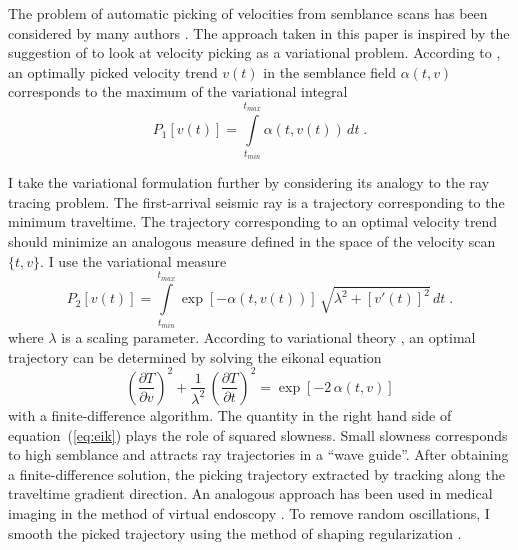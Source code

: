 

The problem of automatic picking of velocities from semblance scans
has been considered by many authors
\cite[]{SEG-1999-11621165,SEG-2003-20882091,SEG-2004-16271629}. The
approach taken in this paper is inspired by the suggestion of
\cite{harlan} to look at velocity picking as a variational
problem. According to \cite{harlan}, an optimally picked velocity trend
$v(t)$ in the semblance field $\alpha(t,v)$ corresponds to the maximum
of the variational integral
\begin{equation}
P_1[v(t)] = \int\limits_{t_{min}}^{t_{max}} \alpha\left(t,v(t)\right)\,d t\;.
\end{equation}

I take the variational formulation further by considering its
analogy to the ray tracing problem. The first-arrival seismic
ray is a trajectory corresponding to the minimum traveltime. The
trajectory corresponding to an optimal velocity trend should minimize
an analogous measure defined in the space of the velocity
scan~$\{t,v\}$. I use the variational measure
\begin{equation}
P_2[v(t)] = \int\limits_{t_{min}}^{t_{max}}
\exp[-\alpha\left(t,v(t)\right)]\,\sqrt{\lambda^2+\left[v'(t)\right]^2}\,d t\;.
\end{equation}
where $\lambda$ is a scaling parameter. According to  variational theory
\cite[]{lanc}, an optimal trajectory can be determined by solving the eikonal equation
\begin{equation}
\label{eq:eik}
\left(\frac{\partial T}{\partial v}\right)^2 + 
\frac{1}{\lambda^2}\,\left(\frac{\partial T}{\partial t}\right)^2 = 
\exp[-2\,\alpha\left(t,v\right)]
\end{equation}
with a finite-difference algorithm. The quantity in the right hand
side of equation~(\ref{eq:eik}) plays the role of squared slowness.
Small slowness corresponds to high semblance and attracts ray
trajectories in a ``wave guide''. After obtaining a finite-difference
solution, the picking trajectory   extracted by
tracking  along the traveltime gradient direction. An
analogous approach has been used in medical imaging in the method of
virtual endoscopy \cite[]{thomas}.  To remove random oscillations, I
smooth the picked trajectory using the method of shaping
regularization
\cite[]{shape}.



